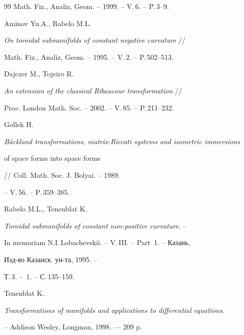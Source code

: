 \begin{thebibliography}{99}
Math. Fiz., Analiz, Geom. -- 1999. -- V.\,6. -- P.\,3--9.







Aminov Yu.A., Rabelo M.L.


{\em On toroidal submanifolds of constant negative curvature} //


Math. Fiz., Analiz, Geom. -- 1995. -- V.\,2. -- P.\,502--513.







Dajczer M., Tojeiro R.


{\em An extension of the classical Ribaucour transformation} //


Proc. London Math. Soc. -- 2002. -- V.\,85. -- P.\,211--232.







Gollek H.


{\em B\"acklund transformations, matrix-Riccati systems and isometric immersions


of space forms into space forms} // Coll. Math. Soc. J. Bolyai. -- 1989.


-- V.\,56. -- P.\,359--385.







Rabelo M.L., Tenenblat K.


{\em Toroidal submanifolds of constant non-positive curvature}. --


In memoriam N.I.\,Lobachevskii. -- V.\,III. -- Part~1. -- Казань,


Изд-во Казанск. ун-та, 1995. -- 


Т.\,3. -- \No\,1. -- С.\,135--159.


 




Tenenblat K.


{\it Transformations of manifolds and applications to differential equations}.


-- Addison Wesley, Longman, 1998. --- 209 p.








\end{thebibliography}





